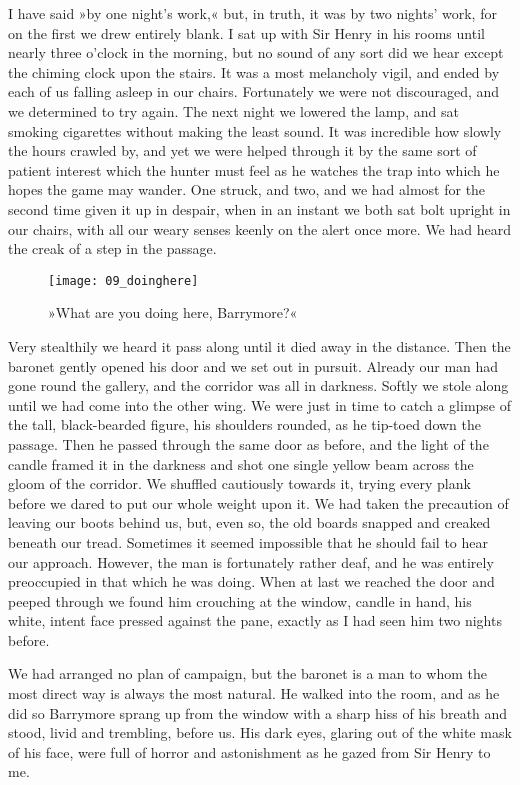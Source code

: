 I have said »by one night's work,« but, in truth, it was by two nights' work, for on the first we drew entirely blank. I sat up with Sir Henry in his rooms until nearly three o'clock in the morning, but no sound of any sort did we hear except the chiming clock upon the stairs. It was a most melancholy vigil, and ended by each of us falling asleep in our chairs. Fortunately we were not discouraged, and we determined to try again. The next night we lowered the lamp, and sat smoking cigarettes without making the least sound. It was incredible how slowly the hours crawled by, and yet we were helped through it by the same sort of patient interest which the hunter must feel as he watches the trap into which he hopes the game may wander. One struck, and two, and we had almost for the second time given it up in despair, when in an instant we both sat bolt upright in our chairs, with all our weary senses keenly on the alert once more. We had heard the creak of a step in the passage.

\begin{wrapfigure}{O}{0.7\textwidth}
\centering
\texttt{[image: 09\_doinghere]}
\caption{»What are you doing here, Barrymore?«}
\end{wrapfigure}

Very stealthily we heard it pass along until it died away in the distance. Then the baronet gently opened his door and we set out in pursuit. Already our man had gone round the gallery, and the corridor was all in darkness. Softly we stole along until we had come into the other wing. We were just in time to catch a glimpse of the tall, black-bearded figure, his shoulders rounded, as he tip-toed down the passage. Then he passed through the same door as before, and the light of the candle framed it in the darkness and shot one single yellow beam across the gloom of the corridor. We shuffled cautiously towards it, trying every plank before we dared to put our whole weight upon it. We had taken the precaution of leaving our boots behind us, but, even so, the old boards snapped and creaked beneath our tread. Sometimes it seemed impossible that he should fail to hear our approach. However, the man is fortunately rather deaf, and he was entirely preoccupied in that which he was doing. When at last we reached the door and peeped through we found him crouching at the window, candle in hand, his white, intent face pressed against the pane, exactly as I had seen him two nights before.

We had arranged no plan of campaign, but the baronet is a man to whom the most direct way is always the most natural. He walked into the room, and as he did so Barrymore sprang up from the window with a sharp hiss of his breath and stood, livid and trembling, before us. His dark eyes, glaring out of the white mask of his face, were full of horror and astonishment as he gazed from Sir Henry to me.

